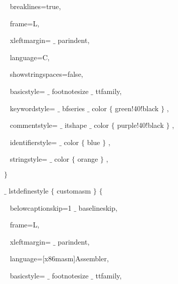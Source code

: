 {\fontsize{10pt}{10pt}\selectfont ~ breaklines=true,}\par

{\fontsize{10pt}{10pt}\selectfont ~ frame=L,}\par

{\fontsize{10pt}{10pt}\selectfont ~ xleftmargin= $ \_ $ parindent,}\par

{\fontsize{10pt}{10pt}\selectfont ~ language=C,}\par

{\fontsize{10pt}{10pt}\selectfont ~ showstringspaces=false,}\par

{\fontsize{10pt}{10pt}\selectfont ~ basicstyle= $ \_ $ footnotesize $ \_ $ ttfamily,}\par

{\fontsize{10pt}{10pt}\selectfont ~ keywordstyle= $ \_ $ bfseries $ \_ $ color $ \{ $ green!40!black $ \} $ ,}\par

{\fontsize{10pt}{10pt}\selectfont ~ commentstyle= $ \_ $ itshape $ \_ $ color $ \{ $ purple!40!black $ \} $ ,}\par

{\fontsize{10pt}{10pt}\selectfont ~ identifierstyle= $ \_ $ color $ \{ $ blue $ \} $ ,}\par

{\fontsize{10pt}{10pt}\selectfont ~ stringstyle= $ \_ $ color $ \{ $ orange $ \} $ ,}\par

{\fontsize{10pt}{10pt}\selectfont  $ \} $ }\par

{\fontsize{10pt}{10pt}\selectfont  $ \_ $ lstdefinestyle $ \{ $ customasm $ \} $  $ \{ $ }\par

{\fontsize{10pt}{10pt}\selectfont ~ belowcaptionskip=1 $ \_ $ baselineskip,}\par

{\fontsize{10pt}{10pt}\selectfont ~ frame=L,}\par

{\fontsize{10pt}{10pt}\selectfont ~ xleftmargin= $ \_ $ parindent,}\par

{\fontsize{10pt}{10pt}\selectfont ~ language=[x86masm]Assembler,}\par

{\fontsize{10pt}{10pt}\selectfont ~ basicstyle= $ \_ $ footnotesize $ \_ $ ttfamily,}\par

